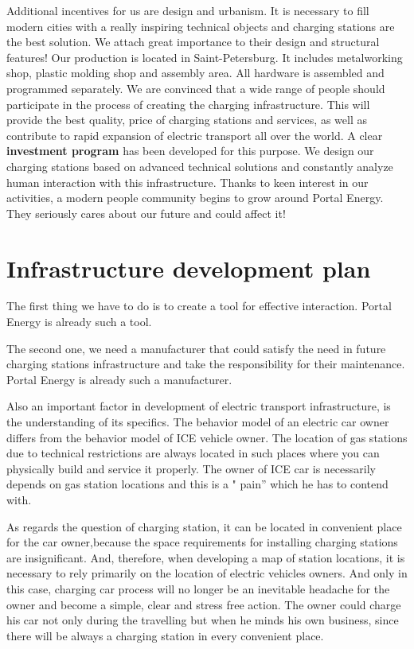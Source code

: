 \documentclass[a4paper,12pt]{report}
\begin{document}
Additional incentives for us are design and urbanism. It is necessary to fill modern cities with a really inspiring technical objects and charging stations  are the best solution. We attach great importance to their design and structural features!
Our production is located in Saint-Petersburg. It includes metalworking shop, plastic molding shop and assembly area. All hardware is assembled and programmed separately.
We are convinced that a wide range of people should participate in the process of creating the charging infrastructure. This will provide the best quality, price of  charging stations and services, as well as contribute to rapid expansion of electric transport all over the world. A clear \textbf{investment program} has been developed for this purpose.
We design our charging stations based on advanced technical solutions and constantly analyze human interaction with this  infrastructure. Thanks to keen interest in our activities, a modern people  community begins to grow around Portal Energy. They  seriously cares about our future and  could affect it!


\chapter{Infrastructure development plan}

The first thing we have to do is to create a tool for effective interaction. Portal Energy is already such a tool.

The second one, we need a manufacturer that could satisfy the need in  future charging stations infrastructure and  take the responsibility  for  their maintenance. Portal Energy is already such a manufacturer.

Also an important factor in  development of electric transport infrastructure, is the understanding of its specifics. The behavior model of an electric car owner differs from the behavior model of  ICE vehicle owner. The location of gas stations  due to  technical restrictions  are always located in such places where you can physically build  and  service it properly. The owner  of ICE car is  necessarily depends on  gas station locations and this  is a  " pain”  which he has to contend with.

As regards the question of charging station, it can be located in  convenient  place  for the car owner,because the space requirements for installing charging stations are insignificant. And, therefore, when developing a map of station locations, it is necessary to rely primarily on the location of electric vehicles owners. And only in this case, charging car process  will no longer be an inevitable headache for the owner and  become a simple, clear and  stress free action. The owner could charge his  car not only during the travelling but when he minds his own business, since there will  be always  a charging station in every convenient place.
\end{document}
